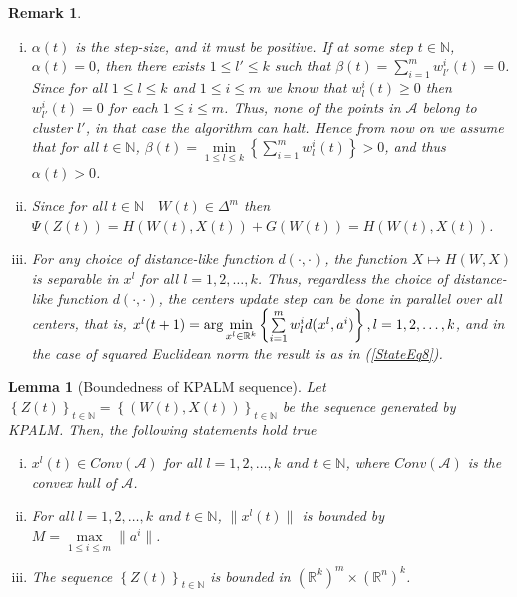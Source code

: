 \documentclass[11pt]{article}
\numberwithin{equation}{section}
\newtheorem{lemma}{Lemma}[proposition]
\newtheorem{remark}{Remark}
\begin{document}
\begin{remark} 
	\begin{enumerate}[(i)] \label{StateEq15}
		\item $\alpha(t)$ is the step-size, and it must be positive. If at some step $t \in \mathbb{N}$, $\alpha(t)=0$, then there exists $1 \leq l' \leq k$ such that $\beta(t) = \sum\limits_{i=1}^{m} w^i_{l'}(t) = 0$. Since for all $1 \leq l \leq k$ and $1 \leq i \leq m$ we know that $w^i_l(t) \geq 0$ then $w^i_{l'}(t)=0$ for each $1 \leq i \leq m$. Thus, none of the points in $\mathcal{A}$ belong to cluster $l'$, in that case the algorithm can halt. Hence from now on we assume that for all $t \in \mathbb{N}$, $\beta(t) = \min\limits_{1 \leq l \leq k} \left\lbrace \sum\limits_{i=1}^{m} w^i_l(t)\right \rbrace > 0$, and thus $\alpha(t) > 0 $.
		\item Since for all $t \in \mathbb{N} \quad W(t) \in \Delta^m$ then $\Psi(Z(t)) = H(W(t),X(t)) + G(W(t)) = H(W(t),X(t))$. \label{StateEq16}
		\item For any choice of distance-like function $d(\cdot, \cdot)$, the function $X \mapsto H(W,X)$ is separable in $x^l$ for all $l = 1, 2, \ldots, k$. Thus, regardless the choice of distance-like function $d(\cdot, \cdot)$, the centers update step can be done in parallel over all centers, that is, $x^l(t+1) = \arg\min\limits_{x^l \in \mathbb{R}^k} \left\lbrace \sum\limits_{i=1}^{m} w^i_l d(x^l , a^i) \right\rbrace, \\ l = 1, 2, \ldots, k$, and in the case of squared Euclidean norm the result is as in (\ref{StateEq8}).
	\end{enumerate}
\end{remark}

\begin{lemma}[Boundedness of KPALM sequence]
Let $\left\lbrace Z(t) \right\rbrace_{t \in \mathbb{N}} = \left\lbrace (W(t) , X(t)) \right\rbrace_{t \in \mathbb{N}}$ be the sequence generated by KPALM. Then, the following statements hold true
\begin{enumerate}[(i)]
	\item $x^l(t) \in Conv(\mathcal{A})$ for all $l=1, 2, \ldots ,k$ and $t \in \mathbb{N}$, where $Conv(\mathcal{A})$ is the convex hull of $\mathcal{A}$.
	\item For all $l=1, 2, \ldots ,k$ and $t \in \mathbb{N}$, $\| x^l(t) \|$ is bounded by $M = \max\limits_{1 \leq i \leq m} \| a^i \|$.
	\item The sequence $\left\lbrace Z(t) \right\rbrace_{t \in \mathbb{N}}$ is bounded in $(\mathbb{R}^k)^m \times (\mathbb{R}^n)^k$.
\end{enumerate}
\end{lemma}
\end{document}
